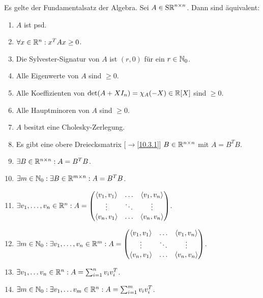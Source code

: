 \documentclass[../../main.tex]{subfiles}
\begin{document}
\begin{sat}\label{14.2.11}
    Es gelte der Fundamentalsatz der Algebra. Sei $A\in\operatorname{S\mathbb R}^{n\times n}$. Dann sind äquivalent:
    \begin{enumerate}[\normalfont(a)]
        \item $A$ ist psd.
        \item $\forall x\in \mathbb R^n: x^TAx\ge 0$.
        \item Die Sylvester-Signatur von $A$ ist $(r,0)$ für ein $r\in \mathbb N_0$.
        \item Alle Eigenwerte von $A$ sind $\ge 0$.
        \item Alle Koeffizienten von $\det(A+XI_n)=\chi_A(-X)\in \mathbb R[X]$ sind $\ge 0$.
        \item Alle Hauptminoren von $A$ sind $\ge 0$.
        \item $A$ besitzt eine Cholesky-Zerlegung.
        \item Es gibt eine obere Dreiecksmatrix [$\to$\ref{10.3.1}] $B\in \mathbb R^{n\times n}$ mit $A=B^TB$.
        \item $\exists B\in \mathbb R^{n\times n}: A=B^TB$.
        \item $\exists m\in \mathbb N_0: \exists B\in \mathbb R^{m\times n}: A=B^TB$.
        \item $\exists v_1,\ldots ,v_n\in \R^n: A=\begin{pmatrix*}\scal{v_1,v_1}&\hdots&\scal{v_1,v_n}\\\vdots &\ddots&\vdots\\ \scal{v_n,v_1}&\hdots&\scal{v_n,v_n}\end{pmatrix*}$.
        \item $\exists m\in \N_0:\exists v_1,\ldots ,v_n\in \R^m: A=\begin{pmatrix*}\scal{v_1,v_1}&\hdots&\scal{v_1,v_n}\\\vdots&\ddots&\vdots\\ \scal{v_n,v_1}&\hdots&\scal{v_n,v_n}\end{pmatrix*}$.
        \item $\exists v_1,\ldots v_n\in \mathbb R^n: A=\sum_{i=1}^n v_iv_i^T$.
        \item $\exists m\in \mathbb N_0:\exists v_1,\ldots v_m\in \mathbb R^n: A=\sum_{i=1}^m v_iv_i^T$.
    \end{enumerate}	 
\end{sat}
\end{document}
